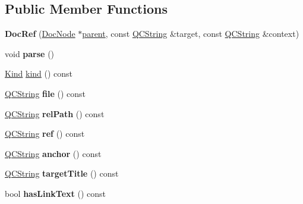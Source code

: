 \subsection*{Public Member Functions}
\begin{DoxyCompactItemize}
\item 
\mbox{\label{class_doc_ref_abd26eba958639f0810bcc5bd4a0c9dc5}} 
{\bfseries Doc\+Ref} (\mbox{\hyperlink{class_doc_node}{Doc\+Node}} $\ast$\mbox{\hyperlink{class_doc_node_a73e8ad29a91cfceb0968eb00db71a23d}{parent}}, const \mbox{\hyperlink{class_q_c_string}{Q\+C\+String}} \&target, const \mbox{\hyperlink{class_q_c_string}{Q\+C\+String}} \&context)
\item 
\mbox{\label{class_doc_ref_a6004b78783411b8c5752371572afa3ef}} 
void {\bfseries parse} ()
\item 
\mbox{\hyperlink{class_doc_node_aebd16e89ca590d84cbd40543ea5faadb}{Kind}} \mbox{\hyperlink{class_doc_ref_a0790bb1c3794fa63436fa73192ef4e1c}{kind}} () const
\item 
\mbox{\label{class_doc_ref_a83619a74c9fc8be97545a13521d5a126}} 
\mbox{\hyperlink{class_q_c_string}{Q\+C\+String}} {\bfseries file} () const
\item 
\mbox{\label{class_doc_ref_a5b1f2ab3fbf5536e661aab0c5b01775a}} 
\mbox{\hyperlink{class_q_c_string}{Q\+C\+String}} {\bfseries rel\+Path} () const
\item 
\mbox{\label{class_doc_ref_ab1f49243161d41850208e8fde53bd9a5}} 
\mbox{\hyperlink{class_q_c_string}{Q\+C\+String}} {\bfseries ref} () const
\item 
\mbox{\label{class_doc_ref_a020050a7e2b6bd6438db4835b5d7130a}} 
\mbox{\hyperlink{class_q_c_string}{Q\+C\+String}} {\bfseries anchor} () const
\item 
\mbox{\label{class_doc_ref_a5c24ebdffb560b02af49504d3d5b8eb1}} 
\mbox{\hyperlink{class_q_c_string}{Q\+C\+String}} {\bfseries target\+Title} () const
\item 
\mbox{\label{class_doc_ref_af54b6d5c031b011dd3877d68bce47455}} 
bool {\bfseries has\+Link\+Text} () const
\item 

\end{DoxyCompactItemize}
